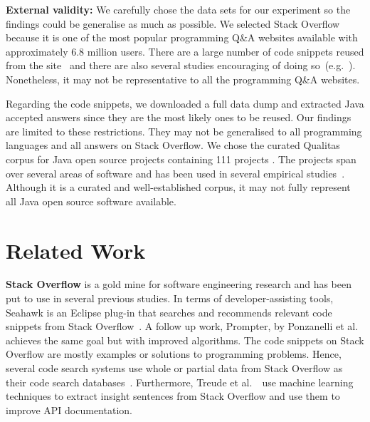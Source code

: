 \documentclass[10pt,journal,compsoc]{IEEEtran}
\begin{document}
\textbf{External validity:} We carefully chose the data sets for our
experiment so the findings could be generalise as much as possible.
We selected Stack Overflow because it is one of the most popular
programming Q\&A websites available with approximately 6.8 million
users.  There are a large number of code snippets reused from the
site~\cite{An2017} and there are also several studies encouraging of
doing
so~(e.g.~\cite{Ponzanelli2013,Ponzanelli2014,Keivanloo2014,Park2014}).
Nonetheless, it may not be representative to all the programming Q\&A
websites.

Regarding the code snippets, we downloaded a full data dump and
extracted Java accepted answers
since they are the
most likely ones to be reused. 
Our findings are limited to these restrictions. They may
not be generalised to all programming languages and all answers on
Stack Overflow. We chose the curated Qualitas
corpus for Java open source projects containing 111 projects
\cite{QualitasCorpus}.  The projects span over several areas of
software and has been used in several empirical
studies~\cite{Taube-Schock2011,Beckman2011,Vasilescu2011,Omar2012}. Although
it is a curated and well-established corpus, it may not fully
represent all Java open source software available.


\section{Related Work}

\textbf{Stack Overflow} is a gold mine for software engineering
research and
has been put to
use in several previous studies. In terms of developer-assisting
tools, Seahawk is an Eclipse plug-in that searches and recommends
relevant code snippets from Stack Overflow~\cite{Ponzanelli2013}. A
follow up work, Prompter, by Ponzanelli et al.~\cite{Ponzanelli2014}
achieves the same goal but with improved algorithms. The code snippets
on Stack Overflow are mostly examples or solutions to programming
problems. Hence, several code search systems use whole or partial data
from Stack Overflow as their code search
databases~\cite{Keivanloo2014,Park2014,
	Stolee2014,Subramanian2013,Diamantopoulos2015}. Furthermore, Treude
et al.~\cite{Treude2016}~use machine learning techniques to extract
insight sentences from Stack Overflow and use them to improve API
documentation.
\end{document}
